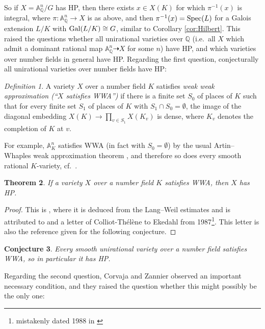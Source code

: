 \documentclass[10pt,a4paper]{amsart}
\theoremstyle{plain}
\newtheorem{theorem}{Theorem}
\newtheorem{conjecture}[theorem]{Conjecture}
\theoremstyle{remark}
\newtheorem{definition}[theorem]{Definition}
\numberwithin{theorem}{section}
\begin{document}
So if $X=\mathbb{A}^n_\mathbb{Q}/G$ has HP, then there exists $x\in X(K)$ for which $\pi^{-1}(x)$ is integral, where $\pi\colon \mathbb{A}^n_\mathbb{Q}\rightarrow X$ is as above, and then
$\pi^{-1}(x)={\rm Spec}(L)$ for a Galois extension $L/K$ with ${\rm Gal}(L/K)\cong G$,
similar to Corollary \ref{cor:Hilbert}.
This raised the questions whether all unirational varieties over $\mathbb{Q}$
(i.e.~all $X$ which admit a dominant rational map $\mathbb{A}^n_\mathbb{Q}\dashrightarrow X$ for some $n$)
have HP,
and which varieties over number fields in general have HP.
Regarding the first question, conjecturally
all unirational varieties over number fields have HP:

\begin{definition}\label{def:WWA}
A variety $X$ over a number field $K$  satisfies {\em weak weak approximation (``$X$ satisfies WWA'')} if there is a finite set $S_0$ of places of $K$ such that
for every finite set $S_1$ of places of $K$ with $S_1\cap S_0=\emptyset$,
the image of the diagonal embedding $X(K)\rightarrow\prod_{v\in S_1}X(K_v)$
is dense, where $K_v$ denotes the completion of $K$ at $v$.
\end{definition}

For example, $\mathbb{A}^n_K$ satisfies WWA (in fact with $S_0=\emptyset$)
by the usual Artin--Whaples weak approximation theorem \cite[Theorem XII.1.2]{Lang_algebra}, and therefore so does every smooth rational $K$-variety, cf.~\cite[Lemma 3.5.5]{Serre}.

\begin{theorem}\label{thm:WWA}
If a variety $X$ over a number field $K$ satisfies WWA, then $X$ has HP.
\end{theorem}

\begin{proof}
This is \cite[Theorem 3.5.7]{Serre}, where it is 
deduced from the Lang--Weil estimates
and is attributed to \cite{Ekedahl} and 
a letter of Colliot-Th\'el\`ene to Ekedahl from 1987\footnote{mistakenly dated 1988 in \cite{Serre}}. This letter is also the reference given for the following conjecture.
\end{proof}

\begin{conjecture}\label{conj:WWA}
Every smooth unirational variety over a number field satisfies WWA, so in particular it has HP.
\end{conjecture}



Regarding the second question, Corvaja and Zannier observed an important necessary condition,
and they  raised the question whether this might possibly be the only one:
 
\end{document}
